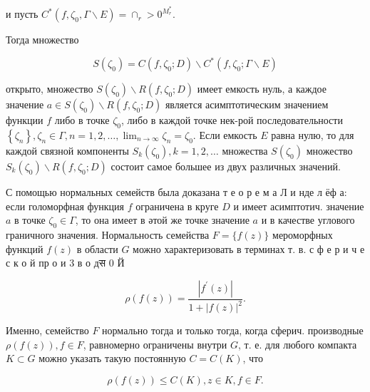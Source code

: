 \documentclass[10pt]{article}
\begin{document}
и пусть $C^{*}\left(f, \zeta_{0}, \Gamma \backslash E\right)=\cap_{r}>0^{M_{r}^{*}}$.



Тогда множество



\[

S\left(\zeta_{0}\right)=C\left(f, \zeta_{0} ; D\right) \backslash C^{*}\left(f, \zeta_{0} ; \Gamma \backslash E\right)

\]



открыто, множество $S\left(\zeta_{0}\right) \backslash R\left(f, \zeta_{0} ; D\right)$ имеет емкость нуль, а каждое значение $a \in S\left(\zeta_{0}\right) \backslash R\left(f, \zeta_{0} ; D\right)$ является асимптотическим значением функции $f$ либо в точке $\zeta_{0}$, либо в каждой точке нек-рой последовательности $\left\{\zeta_{n}\right\}, \zeta_{n} \in \Gamma, n=1,2, \ldots, \lim _{n \rightarrow \infty} \zeta_{n}=\zeta_{0}$. Если емкость $E$ равна нулю, то для каждой связной компоненты $S_{k}\left(\zeta_{0}\right), k=1,2, \ldots$ множества $S\left(\zeta_{0}\right)$ множество $S_{k}\left(\zeta_{0}\right) \backslash R\left(f, \zeta_{0} ; D\right)$ состоит самое большее из двух различных значений.



С помощью нормальных семейств была доказана т е о р е м а Л и нде л ёф а: если голоморфная функция $f$ ограничена в круге $D$ и имеет асимптотич. значение $a$ в точке $\zeta_{0} \in \Gamma$, то она имеет в әтой же точке значение $a$ и в качестве углового граничного значения. Нормальность семейства $F=\{f(z)\}$ мероморфных функций $f(z)$ в области $G$ можно характеризовать в терминах т. в. с ф е р и ч е с к о й пр о и 3 в о дस 0 Й



\[

\rho(f(z))=\frac{\left|f^{\prime}(z)\right|}{1+|f(z)|^{2}} .

\]



Именно, семейство $F$ нормально тогда и только тогда, когда сферич. производные $\rho(f(z)), f \in F$, равномерно ограничены внутри $G$, т. е. для любого компакта $K \subset G$ можно указать такую постоянную $C=C(K)$, что



\[

\rho(f(z)) \leqslant C(K), z \in K, f \in F .

\]
\end{document}
